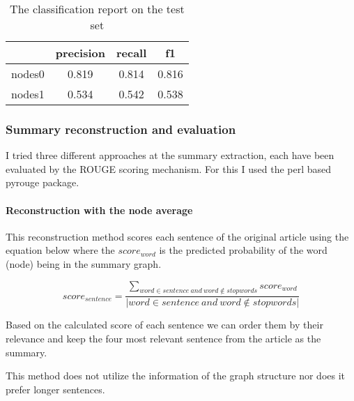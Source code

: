 \begin{table}[!h]
	\centering
	\begin{tabular}{| c | c | c | c |}
		\hline
		& precision & recall & f1 \\ \hline \hline
		nodes0 & 0.819 & 0.814 & 0.816 \\ \hline
		nodes1 & 0.534 & 0.542 & 0.538 \\ \hline
	\end{tabular}
	\caption{The classification report on the test set}
\end{table}

\subsubsection{Summary reconstruction and evaluation}
I tried three different approaches at the summary extraction, each have been evaluated by the ROUGE scoring mechanism. For this I used the perl based pyrouge package.

\paragraph{Reconstruction with the node average}

This reconstruction method scores each sentence of the original article using the equation below where the \(score_{word}\) is the predicted probability of the word (node) being in the summary graph.

\[score_{sentence} = \frac{\sum_{word \in sentence\ and\ word \notin stopwords} score_{word}}{|word \in sentence\ and\ word \notin stopwords|}\]

Based on the calculated score of each sentence we can order them by their relevance and keep the four most relevant sentence from the article as the summary.

This method does not utilize the information of the graph structure nor does it prefer longer sentences.



